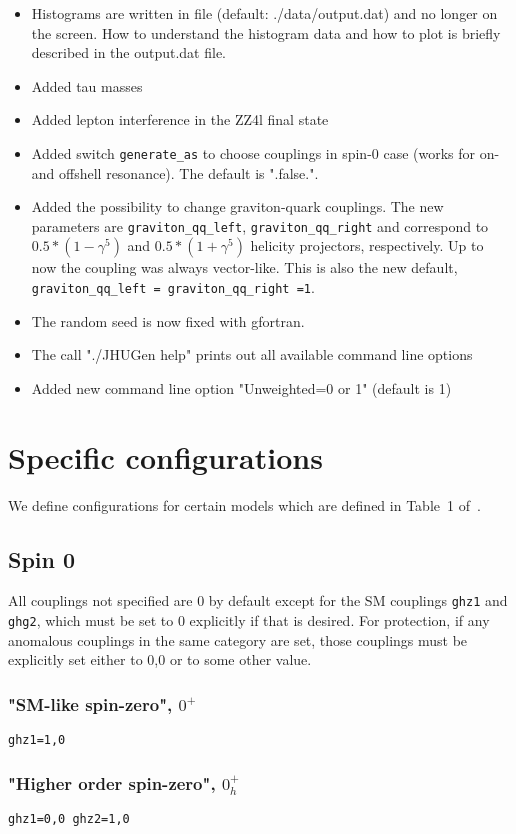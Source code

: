\documentclass[aps,superscriptaddress,nofootinbib]{revtex4}
\begin{document}
\begin{itemize}
\item Histograms are written in file (default: ./data/output.dat) and no longer on the screen.  How to understand the histogram data and how to plot is briefly described in the output.dat file.
\item Added tau masses
\item Added lepton interference in the ZZ4l final state
\item Added switch \verb|generate_as| to choose couplings in spin-0 case (works for on- and offshell resonance). The default is ".false.".
\item Added the possibility to change graviton-quark couplings. The new parameters are \verb|graviton_qq_left|, \verb|graviton_qq_right| and correspond to $0.5*(1-\gamma^5)$ and $0.5*(1+\gamma^5)$ helicity projectors, respectively. Up to now the coupling was always vector-like. This is also the new default, \verb|graviton_qq_left = graviton_qq_right =1|.
\item The random seed is now fixed with gfortran.
\item The call "./JHUGen help" prints out all available command line options
\item Added new command line option "Unweighted=0 or 1" (default is 1)
\end{itemize}
\clearpage
\appendix
\section{Specific configurations}
We define configurations for certain models which are defined in Table~1 of~\cite{Bolognesi:2012}.
\subsection{Spin 0}
All couplings not specified are 0 by default except for the SM couplings \verb|ghz1| and \verb|ghg2|, which must be set to 0 explicitly if that is desired.  For protection, if any anomalous couplings in the same category are set, those couplings must be explicitly set either to 0,0 or to some other value.
\subsubsection{"SM-like spin-zero", \texorpdfstring{$0^+$}{0+}}
\verb|ghz1=1,0|
\subsubsection{"Higher order spin-zero", \texorpdfstring{$0_h^+$}{0h+}}
\verb|ghz1=0,0 ghz2=1,0|
\end{document}
